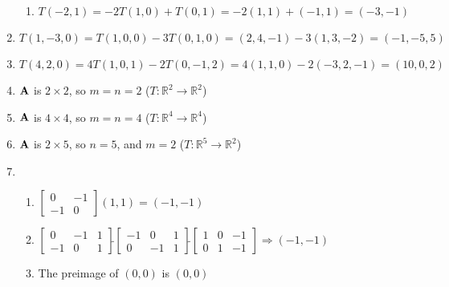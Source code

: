 \documentclass[12pt]{article}
\begin{document}
\begin{enumerate}
\begin{enumerate}
      \item $T(-2,1)=-2T(1,0)+T(0,1)=-2(1,1)+(-1,1)=(-3,-1)$

    \end{enumerate}

    \setcounter{enumi}{24}

  \item $T(1,-3,0)=T(1,0,0)-3T(0,1,0)=(2,4,-1)-3(1,3,-2)=(-1,-5,5)$

    \setcounter{enumi}{28}

  \item $T(4,2,0)=4T(1,0,1)-2T(0,-1,2)=4(1,1,0)-2(-3,2,-1)=(10,0,2)$

    \setcounter{enumi}{32}

  \item $\bold{A}$ is $2\times2$, so $m=n=2$ ($T:\mathbb{R}^2\rightarrow\mathbb{R}^2$)

    \setcounter{enumi}{35}

  \item $\bold{A}$ is $4\times4$, so $m=n=4$ ($T:\mathbb{R}^4\rightarrow\mathbb{R}^4$)

  \item $\bold{A}$ is $2\times5$, so $n=5$, and $m=2$ ($T:\mathbb{R}^5\rightarrow\mathbb{R}^2$)

    \setcounter{enumi}{38}

  \item

    \begin{enumerate}

      \item $\begin{bmatrix} 0 & -1\\ -1 &0  \end{bmatrix}(1,1)=(-1,-1)$

      \item $\left[ \begin{array}{cc|c} 0 & -1 & 1\\ -1 & 0 & 1  \end{array} \right]\widetilde{ }\left[ \begin{array}{cc|c} -1 & 0 & 1\\ 0 & -1 & 1  \end{array} \right]\widetilde{ }\left[ \begin{array}{cc|c} 1 & 0 & -1\\ 0 & 1 & -1 \end{array} \right]\Rightarrow(-1,-1)$

      \item The preimage of $(0,0)$ is $(0,0)$


\end{enumerate}
\end{enumerate}
\end{document}

